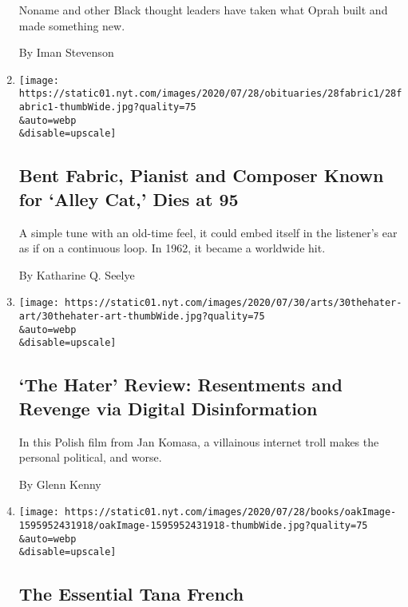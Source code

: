 \begin{enumerate}
  Noname and other Black thought leaders have taken what Oprah built and
  made something new.

  By Iman Stevenson
\item
  \href{/2020/07/29/arts/music/bent-fabric-dead.html}{}

  \texttt{[image: https://static01.nyt.com/images/2020/07/28/obituaries/28fabric1/28fabric1-thumbWide.jpg?quality=75\\\&auto=webp\\\&disable=upscale]}

  \hypertarget{bent-fabric-pianist-and-composer-known-for-alley-cat-dies-at-95}{%
  \subsection{Bent Fabric, Pianist and Composer Known for `Alley Cat,'
  Dies at
  95}\label{bent-fabric-pianist-and-composer-known-for-alley-cat-dies-at-95}}

  A simple tune with an old-time feel, it could embed itself in the
  listener's ear as if on a continuous loop. In 1962, it became a
  worldwide hit.

  By Katharine Q. Seelye
\item
  \href{/2020/07/29/movies/the-hater-review.html}{}

  \texttt{[image: https://static01.nyt.com/images/2020/07/30/arts/30thehater-art/30thehater-art-thumbWide.jpg?quality=75\\\&auto=webp\\\&disable=upscale]}

  \hypertarget{the-hater-review-resentments-and-revenge-via-digital-disinformation}{%
  \subsection{`The Hater' Review: Resentments and Revenge via Digital
  Disinformation}\label{the-hater-review-resentments-and-revenge-via-digital-disinformation}}

  In this Polish film from Jan Komasa, a villainous internet troll makes
  the personal political, and worse.

  By Glenn Kenny
\item
  \href{/2020/07/29/books/the-essential-tana-french.html}{}

  \texttt{[image: https://static01.nyt.com/images/2020/07/28/books/oakImage-1595952431918/oakImage-1595952431918-thumbWide.jpg?quality=75\\\&auto=webp\\\&disable=upscale]}

  \hypertarget{the-essential-tana-french}{%
  \subsection{The Essential Tana
  French}\label{the-essential-tana-french}}


\end{enumerate}
